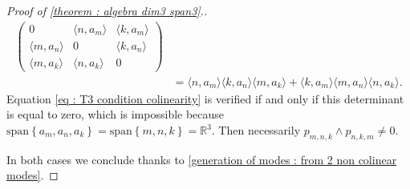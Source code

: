 \documentclass[10pt,a4paper]{amsart}
\newcommand{\R}{{\mathbb R}}
\newcommand{\la}{\langle}
\newcommand{\ra}{\rangle}
\newcommand{\we}{\wedge}
\begin{document}
\begin{proof}[Proof of \cref{theorem : algebra dim3 span3}.]
\begin{align*}
\begin{pmatrix}
            0& \la n,a_m\ra & \la k,a_m\ra \\
            \la m,a_n \ra & 0 & \la k,a_n \ra \\
            \la m,a_k \ra & \la n,a_k \ra & 0
        \end{pmatrix} \\
        &=\la n,a_m\ra \la k,a_n \ra \la m,a_k \ra + \la k,a_m \ra \la m,a_n \ra \la n,a_k \ra.
    \end{align*}
    Equation \eqref{eq : T3 condition colinearity} is verified if and only if this determinant is equal to zero, which is impossible because $\mathrm{span}\left\{a_m,a_n,a_k\right\}=\mathrm{span}\left\{m,n,k\right\}=\R^3$. Then necessarily $p_{m,n,k}\we p_{n,k,m}\neq 0$. 
    
    In both cases we conclude thanks to \cref{generation of modes : from 2 non colinear modes}.
    \end{proof}
\end{document}
